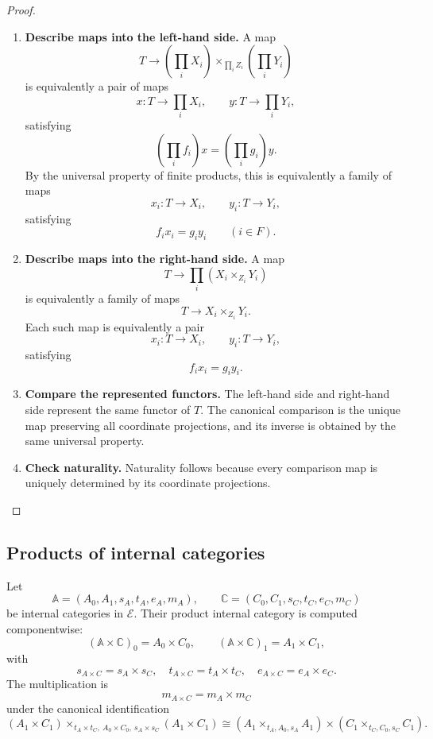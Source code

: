\begin{proof}
    \leavevmode
    \begin{enumerate}
        \item \textbf{Describe maps into the left-hand side.}
        A map
        \[
            T\to
            \left(\prod_iX_i\right)
            \times_{\prod_i Z_i}
            \left(\prod_iY_i\right)
        \]
        is equivalently a pair of maps
        \[
            x:T\to\prod_iX_i,
            \qquad
            y:T\to\prod_iY_i,
        \]
        satisfying
        \[
            \left(\prod_i f_i\right)x
            =
            \left(\prod_i g_i\right)y.
        \]
        By the universal property of finite products, this is equivalently a
        family of maps
        \[
            x_i:T\to X_i,
            \qquad
            y_i:T\to Y_i,
        \]
        satisfying
        \[
            f_ix_i=g_iy_i
            \qquad (i\in F).
        \]

        \item \textbf{Describe maps into the right-hand side.}
        A map
        \[
            T\to\prod_i(X_i\times_{Z_i}Y_i)
        \]
        is equivalently a family of maps
        \[
            T\to X_i\times_{Z_i}Y_i.
        \]
        Each such map is equivalently a pair
        \[
            x_i:T\to X_i,
            \qquad
            y_i:T\to Y_i,
        \]
        satisfying
        \[
            f_ix_i=g_iy_i.
        \]

        \item \textbf{Compare the represented functors.}
        The left-hand side and right-hand side represent the same functor of
        \(T\). The canonical comparison is the unique map preserving all
        coordinate projections, and its inverse is obtained by the same
        universal property.

        \item \textbf{Check naturality.}
        Naturality follows because every comparison map is uniquely determined
        by its coordinate projections.
    \end{enumerate}
\end{proof}

\subsection{Products of internal categories}
\label{subsec:cmett-products-internal-categories}

Let
\[
    \mathbb A=(A_0,A_1,s_A,t_A,e_A,m_A),
    \qquad
    \mathbb C=(C_0,C_1,s_C,t_C,e_C,m_C)
\]
be internal categories in \(\mathcal E\). Their product internal category is
computed componentwise:
\[
    (\mathbb A\times\mathbb C)_0=A_0\times C_0,
    \qquad
    (\mathbb A\times\mathbb C)_1=A_1\times C_1,
\]
with
\[
    s_{A\times C}=s_A\times s_C,
    \quad
    t_{A\times C}=t_A\times t_C,
    \quad
    e_{A\times C}=e_A\times e_C.
\]
The multiplication is
\[
    m_{A\times C}=m_A\times m_C
\]
under the canonical identification
\[
    (A_1\times C_1)
    \times_{t_A\times t_C,\ A_0\times C_0,\ s_A\times s_C}
    (A_1\times C_1)
    \cong
    (A_1\times_{t_A,A_0,s_A}A_1)
    \times
    (C_1\times_{t_C,C_0,s_C}C_1).
\]

